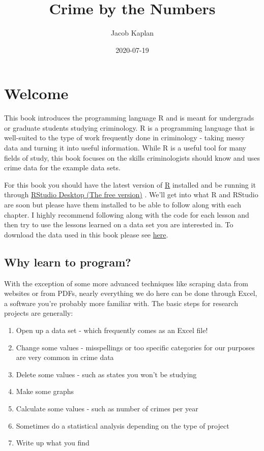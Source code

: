 \documentclass[
  12pt,
]{book}
\title{Crime by the Numbers}
\author{Jacob Kaplan}
\date{2020-07-19}
\providecommand{\tightlist}{%
  \setlength{\itemsep}{0pt}\setlength{\parskip}{0pt}}
\begin{document}
\maketitle

{
\hypersetup{linkcolor=}
\setcounter{tocdepth}{1}
\tableofcontents
}
\hypertarget{welcome}{%
\chapter*{Welcome}\label{welcome}}

This book introduces the programming language R and is meant for undergrads or graduate students studying criminology. R is a programming language that is well-suited to the type of work frequently done in criminology - taking messy data and turning it into useful information. While R is a useful tool for many fields of study, this book focuses on the skills criminologists should know and uses crime data for the example data sets.

For this book you should have the latest version of \href{https://cloud.r-project.org/}{R} installed and be running it through \href{https://www.rstudio.com/products/rstudio/download/}{RStudio Desktop (The free version)} . We'll get into what R and RStudio are soon but please have them installed to be able to follow along with each chapter. I highly recommend following along with the code for each lesson and then try to use the lessons learned on a data set you are interested in. To download the data used in this book please see \href{https://github.com/jacobkap/r4crimz/tree/master/data}{here}.

\hypertarget{why-learn-to-program}{%
\section*{Why learn to program?}\label{why-learn-to-program}}

With the exception of some more advanced techniques like scraping data from websites or from PDFs, nearly everything we do here can be done through Excel, a software you're probably more familiar with. The basic steps for research projects are generally:

\begin{enumerate}
\def\labelenumi{\arabic{enumi}.}
\tightlist
\item
  Open up a data set - which frequently comes as an Excel file!
\item
  Change some values - misspellings or too specific categories for our purposes are very common in crime data
\item
  Delete some values - such as states you won't be studying
\item
  Make some graphs
\item
  Calculate some values - such as number of crimes per year
\item
  Sometimes do a statistical analysis depending on the type of project
\item
  Write up what you find
\end{enumerate}
\end{document}
